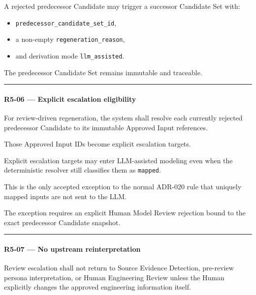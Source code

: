 A rejected predecessor Candidate may trigger a successor Candidate Set with:

\begin{itemize}
\tightlist
\item
  \texttt{predecessor\_candidate\_set\_id},
\item
  a non-empty \texttt{regeneration\_reason},
\item
  and derivation mode \texttt{llm\_assisted}.
\end{itemize}

The predecessor Candidate Set remains immutable and traceable.

\begin{center}\rule{0.5\linewidth}{0.5pt}\end{center}

\hypertarget{r5-06--explicit-escalation-eligibility}{%
\paragraph{R5-06 --- Explicit escalation eligibility}\label{r5-06--explicit-escalation-eligibility}}

For review-driven regeneration, the system shall resolve each currently rejected predecessor Candidate to its immutable Approved Input references.

Those Approved Input IDs become explicit escalation targets.

Explicit escalation targets may enter LLM-assisted modeling even when the deterministic resolver still classifies them as \texttt{mapped}.

This is the only accepted exception to the normal ADR-020 rule that uniquely mapped inputs are not sent to the LLM.

The exception requires an explicit Human Model Review rejection bound to the exact predecessor Candidate snapshot.

\begin{center}\rule{0.5\linewidth}{0.5pt}\end{center}

\hypertarget{r5-07--no-upstream-reinterpretation}{%
\paragraph{R5-07 --- No upstream reinterpretation}\label{r5-07--no-upstream-reinterpretation}}

Review escalation shall not return to Source Evidence Detection, pre-review persona interpretation, or Human Engineering Review unless the Human explicitly changes the approved engineering information itself.

